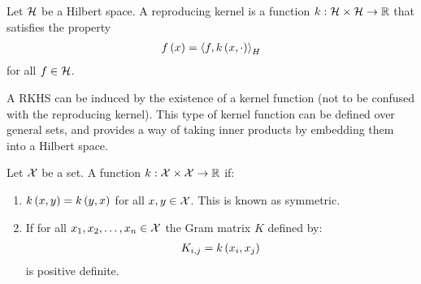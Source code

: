 \documentclass[12pt]{article}
\begin{document}
\begin{definition}
  Let \(\mathcal{H}\) be a Hilbert space.
  A reproducing kernel is a function
  \(k : \mathcal{H} \times \mathcal{H} \to \mathbb{R}\)
  that satisfies the property
  \begin{align*}
    f\left(x\right) = \left\langle f, k\left(x, \cdot\right)\right\rangle_H
  \end{align*}
  for all \(f \in \mathcal{H}\).
\end{definition}

A RKHS can be induced by the existence
of a kernel function (not to be confused with the reproducing kernel).
This type of kernel function can be defined over general sets,
and provides a way of taking inner products by embedding them
into a Hilbert space.

\begin{definition}[Kernel]
  Let \(\mathcal{X}\) be a set.
  A function \(k : \mathcal{X} \times \mathcal{X} \to \mathbb{R}\) if:

  \begin{enumerate}
    \item
      \(k\left(x, y\right) = k\left(y, x\right)\) for all \(x, y \in \mathcal{X}\).
      This is known as symmetric.

    \item
      If for all \(x_1, x_2, \ldots, x_n \in \mathcal{X}\)
      the Gram matrix \(K\)
      defined by:
      \begin{align*}
        K_{i, j} = k\left(x_i, x_j\right)
      \end{align*}
      is positive definite.


  \end{enumerate}

\end{definition}
\end{document}
